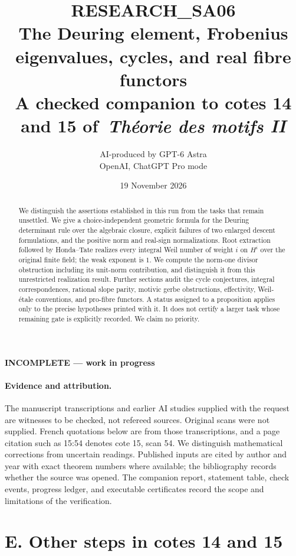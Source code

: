 \documentclass[11pt,a4paper]{article}
\title{\textbf{RESEARCH\_SA06}\\[5pt]
The Deuring element, Frobenius eigenvalues, cycles, and real fibre functors\\[5pt]
\large A checked companion to cotes 14 and 15 of\
\emph{Théorie des motifs II}}
\author{AI-produced by GPT-6 Astra\\OpenAI, ChatGPT Pro mode}
\date{19 November 2026}
\begin{document}
\maketitle
\begin{center}\textbf{INCOMPLETE --- work in progress}\end{center}
\begin{abstract}
We distinguish the assertions established in this run from the tasks that
remain unsettled. We give a choice-independent geometric formula for the
Deuring determinant rule over the algebraic closure, explicit failures of
two enlarged descent formulations, and the positive norm and real-sign
normalizations. Root extraction followed by Honda--Tate realizes every
integral Weil number of weight $i$ on $H^i$ over the original finite field;
the weak exponent is $1$. We compute the norm-one divisor obstruction
including its unit-norm contribution, and distinguish it from this
unrestricted realization result. Further sections audit the cycle
conjectures, integral correspondences, rational slope parity, motivic
gerbe obstructions, effectivity, Weil-étale conventions, and pro-fibre
functors. A status assigned to a proposition applies only to the precise
hypotheses printed with it. It does not certify a larger task whose
remaining gate is explicitly recorded. We claim no priority.
\end{abstract}
\paragraph{Evidence and attribution.}
The manuscript transcriptions and earlier AI studies supplied with the
request are witnesses to be checked, not refereed sources. Original scans
were not supplied. French quotations below are from those transcriptions,
and a page citation such as 15:54 denotes cote 15, scan 54. We distinguish
mathematical corrections from uncertain readings. Published inputs are
cited by author and year with exact theorem numbers where available;
the bibliography records whether the source was opened. The companion
report, statement table, check events, progress ledger, and executable
certificates record the scope and limitations of the verification.
\tableofcontents
\clearpage




\section{E. Other steps in cotes 14 and 15}





\clearpage
\nocite{*}


\end{document}
